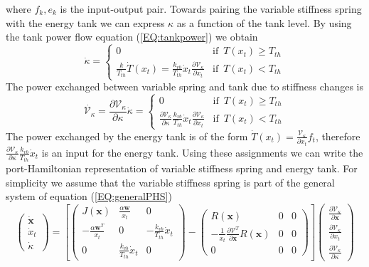 \documentclass[a4paper,twoside, openright,12pt]{report}
\newcommand{\f}[1]{\boldsymbol{#1}}
\begin{document}
where $f_k,e_k$ is the input-output pair. Towards pairing the variable stiffness spring with the energy tank we can express $\kappa$ as a function of the tank level. By using the tank power flow equation (\ref{EQ:tankpower}) we obtain
\begin{equation}
\dot{\kappa} = \begin{cases}
0 & \text{if } \, T(x_t)\geq T_{th} \\
\frac{k}{T_{th}}\dot{T}(x_t) = \frac{k_{vb}}{T_{th}} \dot{x}_t \frac{\partial \mathcal{V}_{\kappa}}{\partial x_t} & \text{if }  \, T(x_t) < T_{th}
\end{cases}
\end{equation}
The power exchanged between variable spring and tank due to stiffness changes is
\begin{equation}
\dot{\mathcal{V}_{\kappa}} = \frac{\partial \mathcal{V}_{\kappa}}{\partial \kappa}\dot{\kappa} =
\begin{cases}
0 & \text{if } \, T(x_t)\geq T_{th} \\
\frac{\partial \mathcal{V}_{\kappa}}{\partial \kappa}\frac{k_{vb}}{T_{th}} \dot{x}_t \frac{\partial \mathcal{V_{\kappa}}}{\partial x_t} & \text{if }  \, T(x_t) < T_{th}
\end{cases}
\end{equation}
The power exchanged by the energy tank is of the form $\dot{T}(x_t) = \frac{\mathcal{V}_{\kappa}}{\partial x_t}f_t$, therefore $\frac{\partial \mathcal{V}_{\kappa}}{\partial \kappa}\frac{k_{vb}}{T_{th}} \dot{x}_t$ is an input for the energy tank. Using these assignments we can write the port-Hamiltonian representation of variable stiffness spring and energy tank. For simplicity we assume that the variable stiffness spring is part of the general system of equation (\ref{EQ:generalPHS})
\begin{equation}
\begin{pmatrix}
\dot{\f{x}} \\ \dot{x}_t \\ \dot{\kappa}
\end{pmatrix} =
\left[
\begin{pmatrix}
J(\f{x}) & \frac{\alpha \f{w}}{x_t} & 0\\ -\frac{\alpha \f{w}^T}{x_t} & 0 & -\frac{k_{vb}}{T_{th}}\dot{x}_t \\ 0 & \frac{k_{vb}}{T_{th}}\dot{x}_t & 0\end{pmatrix}
- 
\begin{pmatrix}
R(\f{x}) & 0 & 0\\ -\frac{1}{x_t}\frac{\partial \mathcal{V}^T}{\partial \f{x}}R(\f{x}) & 0 & 0 \\ 0 & 0 & 0
\end{pmatrix}
\right]
\begin{pmatrix}
\frac{\partial \mathcal{V}_{\kappa}}{\partial \f{x}} \\
\frac{\partial \mathcal{V}_{\kappa}}{\partial x_t} \\
\frac{\partial \mathcal{V}_{\kappa}}{\partial \kappa} 
\end{pmatrix}
\end{equation}
\end{document}
